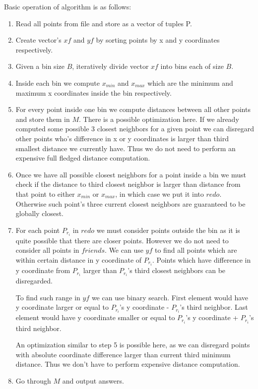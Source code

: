 \documentclass[11pt]{article}
\begin{document}
Basic operation of algorithm is as follows:
\begin{enumerate}
\item Read all points from file and store as a vector of tuples P.
\item Create vector's $xf$ and $yf$ by sorting points by x and y coordinates respectively.
\item Given a bin size $B$, iteratively divide vector $xf$ into bins each of size $B$.
\item Inside each bin we compute $x_{min}$ and $x_{max}$ which are the minimum and maximum x coordinates inside the bin respectively.
\item For every point inside one bin we compute distances between all other points and store them in $M$.  There is a possible optimization here. If we already computed some possible 3 closest neighbors for a given point we can disregard other points who's difference in x or y coordinates is larger than third smallest distance we currently have.  Thus we do not need to perform an expensive full fledged distance computation.
\item Once we have all possible closest neighbors for a point inside a bin we must check if the distance to third closest neighbor is larger than distance from that point to either $x_{min}$ or $x_{max}$, in which case we put it into $redo$.  Otherwise such point's three current closest neighbors are guaranteed to be globally closest.
\item For each point $P_{r_{i}}$ in $redo$ we must consider points outside the bin as it is quite possible that there are closer points.  However we do not need to consider all points in $friends$.  We can use $yf$ to find all points which are within certain distance in y coordinate of $P_{r_{i}}$.  Points which have difference in y coordinate from $P_{r_{i}}$ larger than $P_{r_{i}}$'s third closest neighbors can be disregarded.

To find such range in $yf$ we can use binary search.  First element would have y coordinate larger or equal to $P_{r_{i}}$'s y coordinate - $P_{r_{i}}$'s third neighbor.  Last element would have y coordinate smaller or equal to $P_{r_{i}}$'s y coordinate + $P_{r_{i}}$'s third neighbor.

An optimization similar to step 5 is possible here, as we can disregard points with absolute coordinate difference larger than current third minimum distance.  Thus we don't have to perform expensive distance computation.
\item Go through $M$ and output answers.
\end{enumerate}
\end{document}
